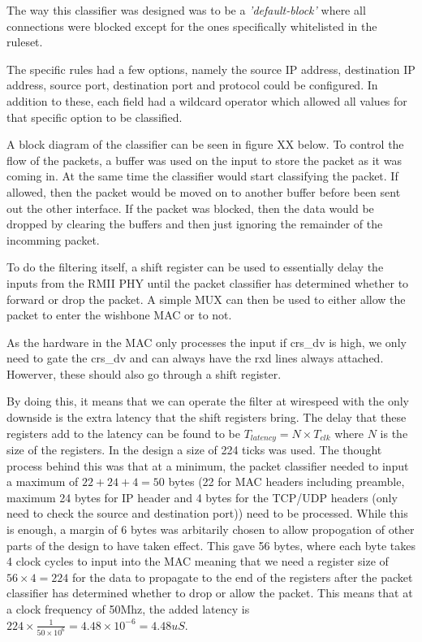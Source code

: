 The way this classifier was designed was to be a \textit{'default-block'} where all connections were blocked except for the ones specifically whitelisted in the ruleset. 

The specific rules had a few options, namely the source IP address, destination IP address, source port, destination port and protocol could be configured. In addition to these, each field had a wildcard operator which allowed all values for that specific option to be classified. 

A block diagram of the classifier can be seen in figure XX below. To control the flow of the packets, a buffer was used on the input to store the packet as it was coming in. At the same time the classifier would start classifying the packet. If allowed, then the packet would be moved on to another buffer before been sent out the other interface. If the packet was blocked, then the data would be dropped by clearing the buffers and then just ignoring the remainder of the incomming packet. 



To do the filtering itself, a shift register can be used to essentially delay the inputs from the RMII PHY until the packet classifier has determined whether to forward or drop the packet. A simple MUX can then be used to either allow the packet to enter the wishbone MAC or to not. 

As the hardware in the MAC only processes the input if crs\_dv is high, we only need to gate the crs\_dv and can always have the rxd lines always attached. Howerver, these should also go through a shift register.

By doing this, it means that we can operate the filter at wirespeed with the only downside is the extra latency that the shift registers bring. The delay that these registers add to the latency can be found to be $T_{latency} = N\times T_{clk}$ where $N$ is the size of the registers. In the design a size of 224 ticks was used. The thought process behind this was that at a minimum, the packet classifier needed to input a maximum of $22 + 24 + 4 = 50$ bytes (22 for MAC headers including preamble, maximum 24 bytes for IP header and 4 bytes for the TCP/UDP headers (only need to check the source and destination port)) need to be processed. While this is enough, a margin of 6 bytes was arbitarily chosen to allow propogation of other parts of the design to have taken effect. This gave 56 bytes, where each byte takes 4 clock cycles to input into the MAC meaning that we need a register size of $56 \times 4=224$ for the data to propagate to the end of the registers after the packet classifier has determined whether to drop or allow the packet. This means that at a clock frequency of 50Mhz, the added latency is $224 \times \frac{1}{50\times 10^6} = 4.48 \times 10^{-6} = 4.48uS$.

